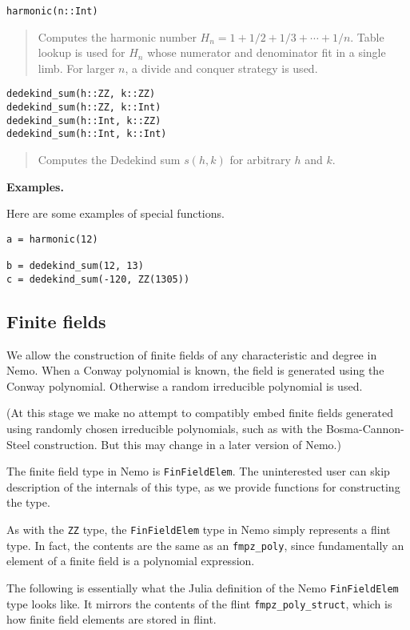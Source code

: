 \documentclass[a4paper,10pt]{article}
\newcommand{\code}{\lstinline}
\newcommand{\desc}[1]{\vspace{-3mm}\begin{quote}#1\end{quote}}
\begin{document}
{{\begin{lstlisting}
harmonic(n::Int)
\end{lstlisting}

\desc{Computes the harmonic number $H_n = 1 + 1/2 + 1/3 + \cdots + 1/n$.
Table lookup is used for $H_n$ whose numerator and denominator 
fit in a single limb. For larger $n$, a divide and conquer strategy is used.}

\begin{lstlisting}
dedekind_sum(h::ZZ, k::ZZ)
dedekind_sum(h::ZZ, k::Int)
dedekind_sum(h::Int, k::ZZ)
dedekind_sum(h::Int, k::Int)
\end{lstlisting}

\desc{Computes the Dedekind sum $s(h,k)$ for arbitrary $h$ and $k$.}

\textbf{Examples.}

Here are some examples of special functions.

\begin{lstlisting}
a = harmonic(12)

b = dedekind_sum(12, 13)
c = dedekind_sum(-120, ZZ(1305))
\end{lstlisting}

\subsection{Finite fields}

We allow the construction of finite fields of any characteristic and degree in
Nemo. When a Conway polynomial is known, the field is generated using the 
Conway polynomial. Otherwise a random irreducible polynomial is used. 

(At this stage we make no attempt to compatibly embed finite fields generated 
using randomly chosen irreducible polynomials, such as with the 
Bosma-Cannon-Steel construction. But this may change in a later version of 
Nemo.) 

The finite field type in Nemo is \code{FinFieldElem}. The uninterested user can skip
description of the internals of this type, as we provide functions for 
constructing the type.

As with the \code{ZZ} type, the \code{FinFieldElem} type in Nemo simply represents a
flint type. In fact, the contents are the same as an \code{fmpz_poly}, since
fundamentally an element of a finite field is a polynomial expression.

The following is essentially what the Julia definition of the Nemo
\code{FinFieldElem} type looks like. It mirrors the contents of the
flint \code{fmpz_poly_struct}, which is how finite field elements are stored
in flint.

}}
\end{document}
